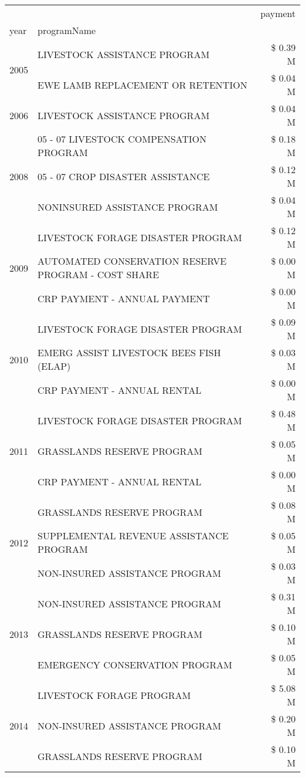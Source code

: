 \begin{tabular}{llr}
\toprule
 &  & payment \\
year & programName &  \\
\midrule
\multirow[t]{2}{*}{2005} & LIVESTOCK ASSISTANCE PROGRAM & \$ 0.39 M \\
 & EWE LAMB REPLACEMENT OR RETENTION & \$ 0.04 M \\
\cline{1-3}
2006 & LIVESTOCK ASSISTANCE PROGRAM & \$ 0.04 M \\
\cline{1-3}
\multirow[t]{3}{*}{2008} & 05 - 07 LIVESTOCK COMPENSATION PROGRAM & \$ 0.18 M \\
 & 05 - 07 CROP DISASTER ASSISTANCE & \$ 0.12 M \\
 & NONINSURED ASSISTANCE PROGRAM & \$ 0.04 M \\
\cline{1-3}
\multirow[t]{3}{*}{2009} & LIVESTOCK FORAGE DISASTER  PROGRAM & \$ 0.12 M \\
 & AUTOMATED CONSERVATION RESERVE PROGRAM - COST SHARE & \$ 0.00 M \\
 & CRP PAYMENT - ANNUAL PAYMENT & \$ 0.00 M \\
\cline{1-3}
\multirow[t]{3}{*}{2010} & LIVESTOCK FORAGE DISASTER PROGRAM & \$ 0.09 M \\
 & EMERG ASSIST LIVESTOCK BEES FISH (ELAP) & \$ 0.03 M \\
 & CRP PAYMENT - ANNUAL RENTAL & \$ 0.00 M \\
\cline{1-3}
\multirow[t]{3}{*}{2011} & LIVESTOCK FORAGE DISASTER PROGRAM & \$ 0.48 M \\
 & GRASSLANDS RESERVE PROGRAM & \$ 0.05 M \\
 & CRP PAYMENT - ANNUAL RENTAL & \$ 0.00 M \\
\cline{1-3}
\multirow[t]{3}{*}{2012} & GRASSLANDS RESERVE PROGRAM & \$ 0.08 M \\
 & SUPPLEMENTAL REVENUE ASSISTANCE PROGRAM & \$ 0.05 M \\
 & NON-INSURED ASSISTANCE PROGRAM & \$ 0.03 M \\
\cline{1-3}
\multirow[t]{3}{*}{2013} & NON-INSURED ASSISTANCE PROGRAM & \$ 0.31 M \\
 & GRASSLANDS RESERVE PROGRAM & \$ 0.10 M \\
 & EMERGENCY CONSERVATION PROGRAM & \$ 0.05 M \\
\cline{1-3}
\multirow[t]{3}{*}{2014} & LIVESTOCK FORAGE PROGRAM & \$ 5.08 M \\
 & NON-INSURED ASSISTANCE PROGRAM & \$ 0.20 M \\
 & GRASSLANDS RESERVE PROGRAM & \$ 0.10 M \\

\end{tabular}
